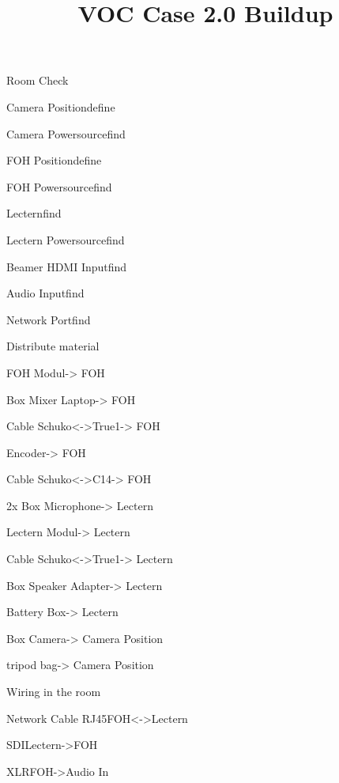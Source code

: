 \def\papersize{4}




\title{VOC Case 2.0 Buildup}

\begin{checklist}{Room Check}
  \item{Camera Position}{define}
  \item{Camera Powersource}{find}
  \item{FOH Position}{define}
  \item{FOH Powersource}{find}
  \item{Lectern}{find}
  \item{Lectern Powersource}{find}
  \item{Beamer HDMI Input}{find}
  \item{Audio Input}{find}
  \item{Network Port}{find}
\end{checklist}

\begin{checklist}{Distribute material}
  \item{FOH Modul}{-> FOH}
  \item{Box Mixer Laptop}{-> FOH}
  \item{Cable Schuko<->True1}{-> FOH}
    \item{Encoder}{-> FOH}
    \item{Cable Schuko<->C14}{-> FOH}
  \item{2x Box Microphone}{-> Lectern}
  \item{Lectern Modul}{-> Lectern}
  \item{Cable Schuko<->True1}{-> Lectern}
  \item{Box Speaker Adapter}{-> Lectern}
  \item{Battery Box}{-> Lectern}
  \item{Box Camera}{-> Camera Position}
  \item{tripod bag}{-> Camera Position}
\end{checklist}

\begin{checklist}{Wiring in the room}
  \item{Network Cable RJ45}{FOH<->Lectern}
  \item{SDI}{Lectern->FOH}
  \item{XLR}{FOH->Audio In}
\end{checklist}

